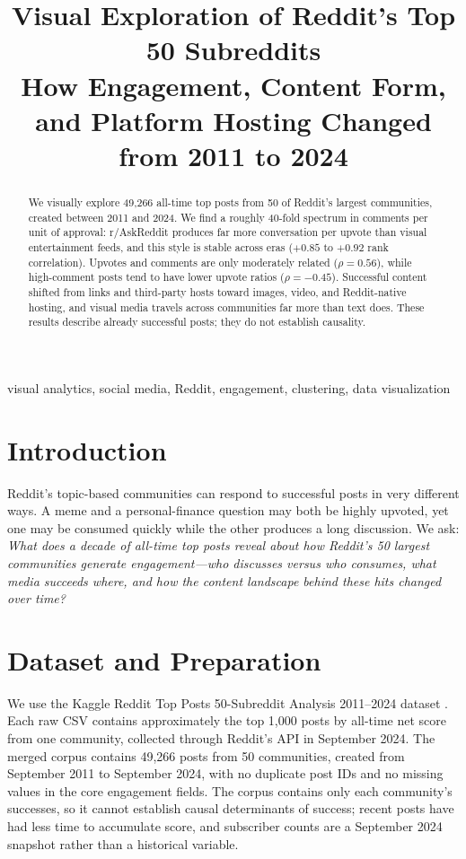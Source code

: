 \documentclass[conference]{IEEEtran}
\title{Visual Exploration of Reddit's Top 50 Subreddits\\
How Engagement, Content Form, and Platform Hosting Changed from 2011 to 2024}
\author{
\IEEEauthorblockN{Sidhanth Prabhu, Shrey Modi, and Parthsarathi Samanta}
\IEEEauthorblockA{
DAS732 Data Visualization, Term 1 (2026--27)\\
International Institute of Information Technology Bangalore\\
\{BT2024027, BT2024125, BT2024083\}}
}
\begin{document}
\maketitle

\begin{abstract}
We visually explore 49,266 all-time top posts from 50 of Reddit's largest communities, created between 2011 and 2024. We find a roughly 40-fold spectrum in comments per unit of approval: r/AskReddit produces far more conversation per upvote than visual entertainment feeds, and this style is stable across eras ($+0.85$ to $+0.92$ rank correlation). Upvotes and comments are only moderately related ($\rho=0.56$), while high-comment posts tend to have lower upvote ratios ($\rho=-0.45$). Successful content shifted from links and third-party hosts toward images, video, and Reddit-native hosting, and visual media travels across communities far more than text does. These results describe already successful posts; they do not establish causality.
\end{abstract}

\begin{IEEEkeywords}
visual analytics, social media, Reddit, engagement, clustering, data visualization
\end{IEEEkeywords}

\section{Introduction}
Reddit's topic-based communities can respond to successful posts in very different ways. A meme and a personal-finance question may both be highly upvoted, yet one may be consumed quickly while the other produces a long discussion. We ask: \emph{What does a decade of all-time top posts reveal about how Reddit's 50 largest communities generate engagement---who discusses versus who consumes, what media succeeds where, and how the content landscape behind these hits changed over time?}

\section{Dataset and Preparation}
We use the Kaggle Reddit Top Posts 50-Subreddit Analysis 2011--2024 dataset \cite{kaggle}. Each raw CSV contains approximately the top 1,000 posts by all-time net score from one community, collected through Reddit's API in September 2024. The merged corpus contains 49,266 posts from 50 communities, created from September 2011 to September 2024, with no duplicate post IDs and no missing values in the core engagement fields. The corpus contains only each community's successes, so it cannot establish causal determinants of success; recent posts have had less time to accumulate score, and subscriber counts are a September 2024 snapshot rather than a historical variable.
\end{document}
